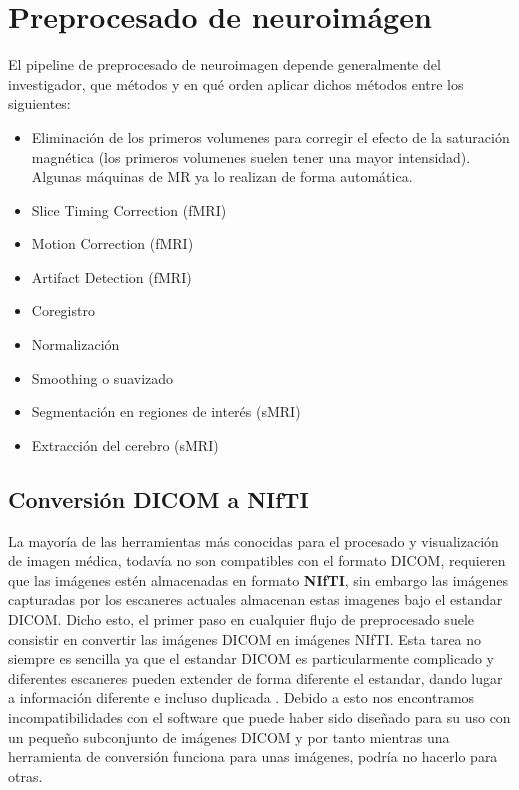 \section{Preprocesado de neuroimágen}

El pipeline de preprocesado de neuroimagen depende generalmente del investigador, que métodos y en qué orden aplicar dichos métodos entre los siguientes:

\begin{itemize}
	\item Eliminación de los primeros volumenes para corregir el efecto de la saturación magnética (los primeros volumenes suelen tener una mayor intensidad). Algunas máquinas de MR ya lo realizan de forma automática.
	\item Slice Timing Correction (fMRI)
	\item Motion Correction (fMRI)
	\item Artifact Detection (fMRI)
	\item Coregistro
	\item Normalización
	\item Smoothing o suavizado
	\item Segmentación en regiones de interés (sMRI) 
	\item Extracción del cerebro (sMRI)
\end{itemize}

\subsection{Conversión DICOM a NIfTI}

La mayoría de las herramientas más conocidas para el procesado y visualización de imagen médica, todavía no son compatibles con el formato DICOM, requieren que las imágenes estén almacenadas en formato \textbf{NIfTI}, sin embargo las imágenes capturadas por los escaneres actuales almacenan estas imagenes bajo el estandar DICOM.
Dicho esto, el primer paso en cualquier flujo de preprocesado suele consistir en convertir las imágenes DICOM en imágenes NIfTI. Esta tarea no siempre es sencilla ya que el estandar DICOM es particularmente complicado y diferentes escaneres pueden extender de forma diferente el estandar, dando lugar a información diferente e incluso duplicada \cite{dcm2nifti}. Debido a esto nos encontramos incompatibilidades con el software que puede haber sido diseñado para su uso con un pequeño subconjunto de imágenes DICOM y por tanto mientras una herramienta de conversión funciona para unas imágenes, podría no hacerlo para otras.

